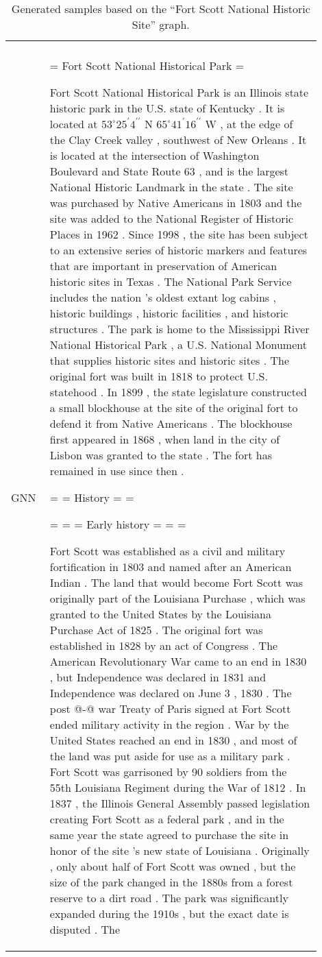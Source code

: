 \documentclass[11pt]{article}
\begin{document}
\begin{table*}[h]
\begin{tabular}{p{0.1\linewidth} | p{0.8\linewidth}}
{} \\
        \cline{1-2}
        GNN & {\tiny = Fort Scott National Historical Park =
        
 Fort Scott National Historical Park is an Illinois state historic park in the U.S. state of Kentucky . It is located at $53 ^\circ 25 ^\prime 4 ^{\prime\prime}$ N $65 ^\circ 41 ^\prime 16 ^{\prime\prime}$ W , at the edge of the Clay Creek valley , southwest of New Orleans . It is located at the intersection of Washington Boulevard and State Route 63 , and is the largest National Historic Landmark in the state . The site was purchased by Native Americans in 1803 and the site was added to the National Register of Historic Places in 1962 . Since 1998 , the site has been subject to an extensive series of historic markers and features that are important in preservation of American historic sites in Texas . 
 The National Park Service includes the nation 's oldest extant log cabins , historic buildings , historic facilities , and historic structures . The park is home to the Mississippi River National Historical Park , a U.S. National Monument that supplies historic sites and historic sites . The original fort was built in 1818 to protect U.S. statehood . In 1899 , the state legislature constructed a small blockhouse at the site of the original fort to defend it from Native Americans . The blockhouse first appeared in 1868 , when land in the city of Lisbon was granted to the state . The fort has remained in use since then .
 
 = = History = = 
 
 = = = Early history = = = 
 
 Fort Scott was established as a civil and military fortification in 1803 and named after an American Indian . The land that would become Fort Scott was originally part of the Louisiana Purchase , which was granted to the United States by the Louisiana Purchase Act of 1825 . The original fort was established in 1828 by an act of Congress . The American Revolutionary War came to an end in 1830 , but Independence was declared in 1831 and Independence was declared on June 3 , 1830 . The post @-@ war Treaty of Paris signed at Fort Scott ended military activity in the region . War by the United States reached an end in 1830 , and most of the land was put aside for use as a military park . 
 Fort Scott was garrisoned by 90 soldiers from the 55th Louisiana Regiment during the War of 1812 . In 1837 , the Illinois General Assembly passed legislation creating Fort Scott as a federal park , and in the same year the state agreed to purchase the site in honor of the site 's new state of Louisiana . Originally , only about half of Fort Scott was owned , but the size of the park changed in the 1880s from a forest reserve to a dirt road . The park was significantly expanded during the 1910s , but the exact date is disputed . The
 
} \\
        \hline
    \end{tabular}
    \caption{Generated samples based on the ``Fort Scott National Historic Site'' graph.}
    \label{tab:samples_vis2}
\end{table*}
\end{document}
